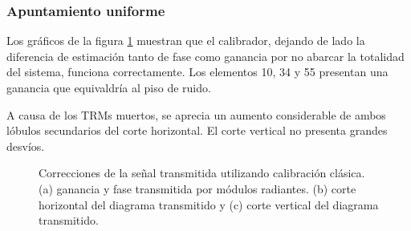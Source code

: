 \subsubsection{Apuntamiento uniforme}

Los gráficos de la figura \ref{fig:deadTRMsClassical0deg} muestran que el calibrador, dejando de lado la diferencia de 
estimación tanto de fase como ganancia por no abarcar la totalidad del sistema, funciona correctamente. Los elementos 10, 34 y 
55 presentan una ganancia que equivaldría al piso de ruido.

A causa de los TRMs muertos, se aprecia un aumento considerable de ambos lóbulos secundarios del corte horizontal. El corte 
vertical no presenta grandes desvíos.

\begin{figure}[H]
	\centering

	\caption{Correcciones de la señal transmitida utilizando calibración clásica. (a) ganancia y fase transmitida por módulos
		radiantes. (b) corte horizontal del diagrama transmitido y (c) corte vertical del diagrama transmitido.}
	\label{fig:deadTRMsClassical0deg}
\end{figure}

